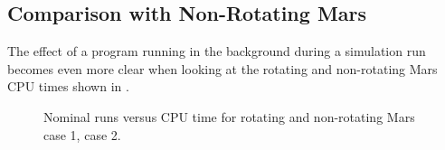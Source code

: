 %



\subsection{Comparison with Non-Rotating Mars}
\label{subsec:timeCompNotRot}
The effect of a program running in the background during a simulation run becomes even more clear when looking at the rotating and non-rotating Mars CPU times shown in . 


%
%


\begin{figure}[H]
\centering
{} 
\caption{Nominal runs versus CPU time for rotating and non-rotating Mars \protect{} case 1,  \protect{} case 2. } 
\label{fig:multiRunVsCPUcase1combinedSmall} 
\end{figure} 

